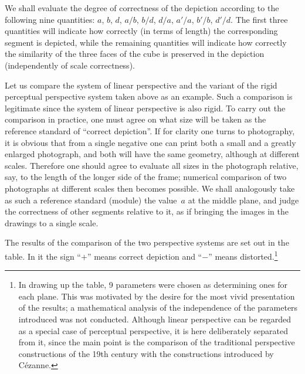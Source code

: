 We shall evaluate the degree of correctness of the depiction according to the
following nine quantities: $a$, $b$, $d$, $a/b$, $b/d$, $d/a$, $a'/a$, $b'/b$,
$d'/d$. The first three quantities will indicate how correctly (in terms of length)
the corresponding segment is depicted, while the remaining quantities will indicate
how correctly the similarity of the three faces of the cube is preserved in the
depiction (independently of scale correctness).


Let us compare the system of linear perspective and the variant of the rigid
perceptual perspective system taken above as an example. Such a comparison is
legitimate since the system of linear perspective is also rigid. To carry out the
comparison in practice, one must agree on what size will be taken as the reference
standard of ``correct depiction''. If for clarity one turns to photography, it is
obvious that from a single negative one can print both a small and a greatly
enlarged photograph, and both will have the same geometry, although at different
scales. Therefore one should agree to evaluate all sizes in the photograph relative,
say, to the length of the longer side of the frame; numerical comparison of two
photographs at different scales then becomes possible. We shall analogously take as
such a reference standard (module) the value~$a$ at the middle plane, and judge the
correctness of other segments relative to it, as if bringing the images in the
drawings to a single scale.


The results of the comparison of the two perspective systems are set out in the
table. In it the sign ``$+$'' means correct depiction and ``$-$'' means
distorted.\footnote{In drawing up the table, 9 parameters were chosen as
  determining ones for each plane. This was motivated by the desire for the most
  vivid presentation of the results; a mathematical analysis of the independence of
  the parameters introduced was not conducted. Although linear perspective can be
  regarded as a special case of perceptual perspective, it is here deliberately
  separated from it, since the main point is the comparison of the traditional
  perspective constructions of the 19th century with the constructions introduced by
  Cézanne.}

